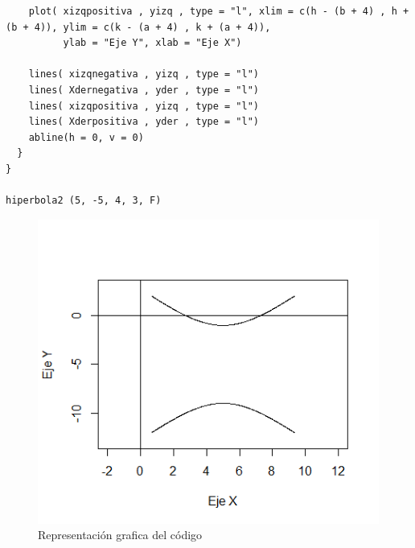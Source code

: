 \documentclass[12pt,a4paper]{article} %
\begin{document}
\begin{table}[htpb]
\begin{lstlisting}
    plot( xizqpositiva , yizq , type = "l", xlim = c(h - (b + 4) , h + (b + 4)), ylim = c(k - (a + 4) , k + (a + 4)),
          ylab = "Eje Y", xlab = "Eje X")
    
    lines( xizqnegativa , yizq , type = "l")
    lines( Xdernegativa , yder , type = "l")
    lines( xizqpositiva , yizq , type = "l")
    lines( Xderpositiva , yder , type = "l")
    abline(h = 0, v = 0)
  }
}

hiperbola2 (5, -5, 4, 3, F)

	\end{lstlisting}
	\caption{Primer código en R para gráficar la hipérbola de la figura \ref{fig:Hiperbola}.}
\label{alg:Hiperbola}	
\end{table}

\begin{figure}
\centering
\includegraphics[scale=0.8]{Hiperbola1}
\caption{Representación grafica del código}
\label{fig:Hiperbola}
\end{figure}
\end{document}
